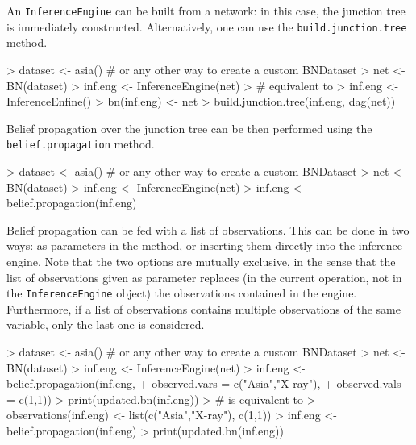 \documentclass{article}
\newcommand{\Robject}[1]{{\texttt{#1}}}
\newcommand{\Rmethod}[1]{{\texttt{#1}}}
\begin{document}
An \Robject{InferenceEngine} can be built from a network: in this case, the junction tree is immediately constructed.
Alternatively, one can use the \Rmethod{build.junction.tree} method.
\begin{Schunk}
\begin{Sinput}
> dataset <- asia() # or any other way to create a custom BNDataset
> net     <- BN(dataset)
> inf.eng <- InferenceEngine(net)
> # equivalent to
> inf.eng <- InferenceEnfine()
> bn(inf.eng) <- net
> build.junction.tree(inf.eng, dag(net))
\end{Sinput}
\end{Schunk}

Belief propagation over the junction tree can be then performed using the \Rmethod{belief.propagation} method.
\begin{Schunk}
\begin{Sinput}
> dataset <- asia() # or any other way to create a custom BNDataset
> net     <- BN(dataset)
> inf.eng <- InferenceEngine(net)
> inf.eng <- belief.propagation(inf.eng)
\end{Sinput}
\end{Schunk}

Belief propagation can be fed with a list of observations. This can be done in two ways: as parameters in the method,
or inserting them directly into the inference engine. Note that the two options are mutually exclusive, in the sense that
the list of observations given as parameter replaces (in the current operation, not in the \Robject{InferenceEngine} object)
the observations contained in the engine. Furthermore, if a list of observations contains multiple observations
of the same variable, only the last one is considered.
\begin{Schunk}
\begin{Sinput}
> dataset <- asia() # or any other way to create a custom BNDataset
> net     <- BN(dataset)
> inf.eng <- InferenceEngine(net)
> inf.eng <- belief.propagation(inf.eng,
+                               observed.vars = c("Asia","X-ray"),
+                               observed.vals = c(1,1))
> print(updated.bn(inf.eng))
> # is equivalent to
> observations(inf.eng) <- list(c("Asia","X-ray"), c(1,1))
> inf.eng <- belief.propagation(inf.eng)
> print(updated.bn(inf.eng))
\end{Sinput}
\end{Schunk}
\end{document}
